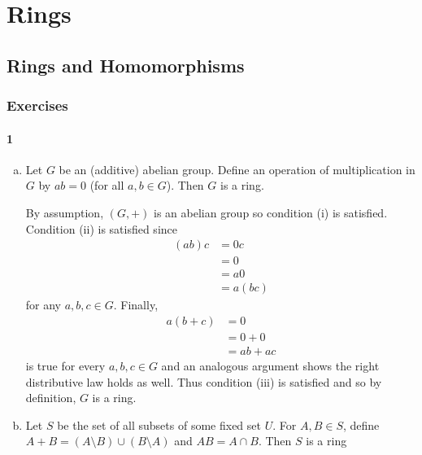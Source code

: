 \chapter{Rings}


\section{Rings and Homomorphisms}

\subsection{Exercises}

\subsubsection*{1}
\begin{enumerate}[(a)]
	\item
	\begin{graybox}
		Let $G$ be an (additive) abelian group. Define an operation of multiplication in $G$ by $ab = 0$ (for all $a, b\in G$). Then $G$ is a ring.
	\end{graybox}
	\begin{solution}
		By assumption, $(G, +)$ is an abelian group so condition (i) is satisfied. Condition (ii) is satisfied since
		\begin{align*}
			(ab)c &= 0c\\
			&= 0\\
			&= a0\\
			&= a(bc)
		\end{align*}
		for any $a,b,c \in G$. Finally,
		\begin{align*}
			a(b + c) &= 0\\
			&= 0 + 0\\
			&= ab + ac
		\end{align*}
		is true for every $a,b,c \in G$ and an analogous argument shows the right distributive law holds as well. Thus condition (iii) is satisfied and so by definition, $G$ is a ring. 
	\end{solution}
	\item
	\begin{graybox}
		Let $S$ be the set of all subsets of some fixed set $U$. For $A, B \in S$, define $A + B = (A \setminus B) \cup (B \setminus A)$ and $AB = A \cap B$. Then $S$ is a ring
	\end{graybox}
	\begin{solution}

\end{solution}
\end{enumerate}
